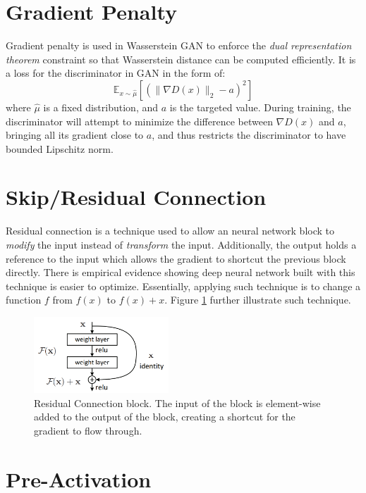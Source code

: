 \section{Gradient Penalty}
\label{app:ml:grad_pen}
Gradient penalty is used in Wasserstein GAN to enforce the \textit{dual representation theorem} constraint so that Wasserstein distance can be computed efficiently. It is a loss for the discriminator in GAN in the form of:
$$
\mathbb{E}_{x \sim \hat{\mu}}\left[\left(\|\nabla D(x)\|_{2}-a\right)^{2}\right]
$$
where $\hat{\mu}$ is a fixed distribution, and $a$ is the targeted value. During training, the discriminator will attempt to minimize the difference between $\nabla D(x)$ and $a$, bringing all its gradient close to $a$, and thus restricts the discriminator to have bounded Lipschitz norm.

\section{Skip/Residual Connection}
\label{app:ml:res_conn}
Residual connection is a technique used to allow an neural network block to \textit{modify} the  input instead of \textit{transform} the input. Additionally, the output holds a reference to the input which allows the gradient to shortcut the previous block directly. There is empirical evidence showing deep neural network built with this technique is easier to optimize. Essentially, applying such technique is to change a function $f$ from $f(x)$ to $f(x)+x$. Figure \ref{fig:res_conn} further illustrate such technique.

\begin{figure}
    \centering
    \includegraphics[width=0.45\textwidth]{images/preliminary/res_conn.png}
    \caption[Residual Connection block.]{Residual Connection block. The input of the block is element-wise added to the output of the block, creating a shortcut for the gradient to flow through.\cite{heDeepResidualLearning2015a}}
    \label{fig:res_conn}
\end{figure}

\section{Pre-Activation}
\label{app:ml:pre_act}

